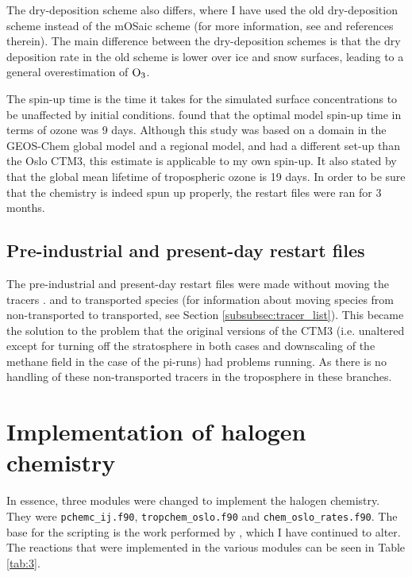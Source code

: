 \medskip


The dry-deposition scheme also differs, where I have used the old dry-deposition scheme instead of the mOSaic scheme (for more information, see \cite{Falk_2019} and references therein). The main difference between the dry-deposition schemes is that the dry deposition rate in the old scheme is lower over ice and snow surfaces, leading to a general overestimation of $\mathrm{O_3}$.


\medskip

The spin-up time is the time it takes for the simulated surface concentrations to be unaffected by initial conditions. \cite{Curci_AirPollution} found that the optimal model spin-up time in terms of ozone was 9 days. Although this study was based on a domain in the GEOS-Chem global model and a regional model, and had a different set-up than the Oslo CTM3, this estimate is applicable to my own spin-up. It also stated by \cite{SeinfeldSpyros} that the global mean lifetime of tropospheric ozone is 19 days. In order to be sure that the chemistry is indeed spun up properly, the restart files were ran for 3 months. 

\subsection{Pre-industrial and present-day restart files}\label{sec:PI_and_PD_restart}

The pre-industrial and present-day restart files were made without moving the tracers .  and  to transported species (for information about moving species from non-transported to transported, see Section \ref{subsubsec:tracer_list}). This became the solution to the problem that the original versions of the CTM3 (i.e. unaltered except for turning off the stratosphere in both cases and downscaling of the methane field in the case of the \acrshort{pi}-runs) had problems running. As there is no handling of these non-transported tracers in the troposphere in these branches. 
 

\section{Implementation of halogen chemistry}

In essence, three modules were changed to implement the halogen chemistry. They were \texttt{pchemc\_ij.f90}, \texttt{tropchem\_oslo.f90} and \texttt{chem\_oslo\_rates.f90}. The base for the scripting is the work performed by \cite{Susanne}, which I have continued to alter.  The reactions that were implemented in the various modules can be seen in Table \ref{tab:3}.


